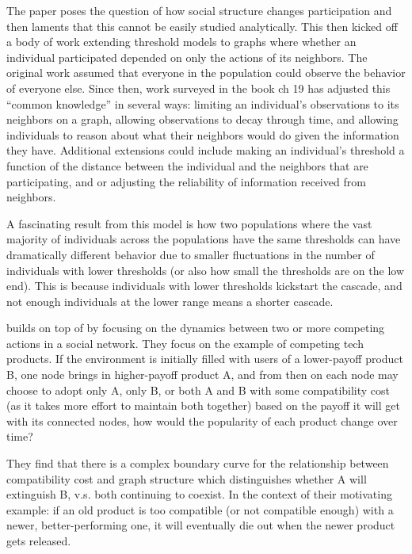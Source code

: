 The paper poses the question of how social structure changes participation and then laments that this cannot be easily studied analytically. This then kicked off a body of work extending threshold models to graphs where whether an individual participated depended on only the actions of its neighbors. The original work assumed that everyone in the population could observe the behavior of everyone else. Since then, work surveyed in the book \cite{networks-crowds-markets} ch 19 has adjusted this “common knowledge” in several ways: limiting an individual’s observations to its neighbors on a graph, allowing observations to decay through time, and allowing individuals to reason about what their neighbors would do given the information they have. Additional extensions could include making an individual’s threshold a function of the distance between the individual and the neighbors that are participating, and or adjusting the reliability of information received from neighbors.

A fascinating result from this model is how two populations where the vast majority of individuals across the populations have the same thresholds can have dramatically different behavior due to smaller fluctuations in the number of individuals with lower thresholds (or also how small the thresholds are on the low end). This is because individuals with lower thresholds kickstart the cascade, and not enough individuals at the lower range means a shorter cascade. 

\cite{immorlica} builds on top of \cite{granovetter} by focusing on the dynamics between two or more competing actions in a social network. They focus on the example of competing tech products. If the environment is initially filled with users of a lower-payoff product B, one node brings in higher-payoff product A, and from then on each node may choose to adopt only A, only B, or both A and B with some compatibility cost (as it takes more effort to maintain both together) based on the payoff it will get with its connected nodes, how would the popularity of each product change over time?

They find that there is a complex boundary curve for the relationship between compatibility cost and graph structure which distinguishes whether A will extinguish B, v.s. both continuing to coexist. In the context of their motivating example: if an old product is too compatible (or not compatible enough) with a newer, better-performing one, it will eventually die out when the newer product gets released.


